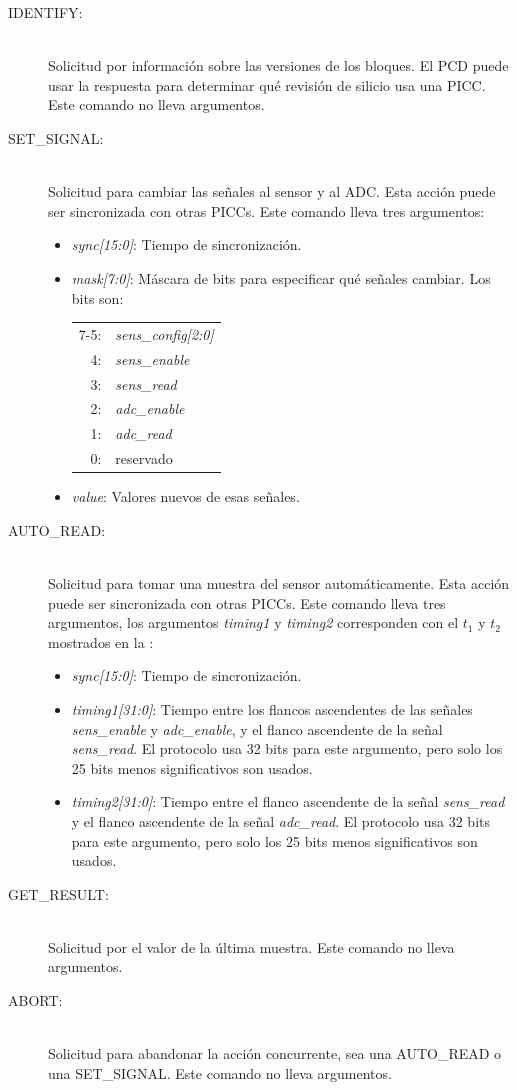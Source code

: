 \documentclass[a4paper, twoside, 11pt]{report}
\begin{document}
\begin{description}
  \item[IDENTIFY:] \hfill \\ Solicitud por información sobre las versiones de los bloques. El PCD puede usar la respuesta para determinar qué revisión de silicio usa una PICC. Este comando no lleva argumentos.
  \item[SET\_SIGNAL:] \hfill \\ Solicitud para cambiar las señales al sensor y al ADC. Esta acción puede ser sincronizada con otras PICCs. Este comando lleva tres argumentos:
  \begin{itemize}
    \item \textit{sync[15:0]}: Tiempo de sincronización.
    \item \textit{mask[7:0]}: Máscara de bits para especificar qué señales cambiar. Los bits son:

    \begin{tabular}{r l}
      7-5: & \textit{sens\_config[2:0]} \\
      4: & \textit{sens\_enable} \\
      3: & \textit{sens\_read} \\
      2: & \textit{adc\_enable} \\
      1: & \textit{adc\_read} \\
      0: & reservado \\
    \end{tabular}
    \item \textit{value}: Valores nuevos de esas señales.
  \end{itemize}
  \item[AUTO\_READ:] \hfill \\ Solicitud para tomar una muestra del sensor automáticamente. Esta acción puede ser sincronizada con otras PICCs. Este comando lleva tres argumentos, los argumentos \textit{timing1} y \textit{timing2} corresponden con el $t_1$ y $t_2$ mostrados en la :
  \begin{itemize}
    \item \textit{sync[15:0]}: Tiempo de sincronización.
    \item \textit{timing1[31:0]}: Tiempo entre los flancos ascendentes de las señales \textit{sens\_enable} y \textit{adc\_enable}, y el flanco ascendente de la señal \textit{sens\_read}. El protocolo usa 32 bits para este argumento, pero solo los 25 bits menos significativos son usados.
    \item \textit{timing2[31:0]}: Tiempo entre el flanco ascendente de la señal \textit{sens\_read} y el flanco ascendente de la señal \textit{adc\_read}. El protocolo usa 32 bits para este argumento, pero solo los 25 bits menos significativos son usados.
  \end{itemize}
  \item[GET\_RESULT:] \hfill \\ Solicitud por el valor de la última muestra. Este comando no lleva argumentos.
  \item[ABORT:] \hfill \\ Solicitud para abandonar la acción concurrente, sea una AUTO\_READ o una SET\_SIGNAL. Este comando no lleva argumentos.
\end{description}
\end{document}

